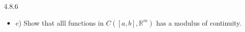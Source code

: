 \documentclass[a4paper,norsk]{article}
\renewcommand{\leq}{\leqslant}
\begin{document}
\begin{oppgavebox}{4.8.6}{}
\begin{itemize}
\begin{proofbox}{4.8.6 b)}{}
    Is $ d_X : X \to \mathbb{R} $ defined by $ d(x) := d_X \left( x, x_0 \right)  $ continuous? If it does, then $ d(x) $ is bounded. It is, because for $ x, y \in X $, we have that 
    \[
        \left| d(x) - d(y) \right| = \left| d_X \left( x, x_0 \right) - d_X \left( y, x_0 \right)   \right| \leq  d_X(x, y)
    \]
    so $ d(x) $ is Lipschitz continuous. Hence, $ \sigma _{ } \left( d(x)  \right) = \sigma _{ } \left( d_X \left( x, x_0 \right)  \right) \leq \sigma _{ } \left( M \right)    $. Thus, K is bounded. 
    
    
    
  \end{proofbox}
  \item c) Show that alll functions in $ C \left( \left[ a, b \right] , \mathbb{R}^m \right)  $ has a modulus of continuity.
  
\end{itemize}

\end{oppgavebox}
\end{document}
